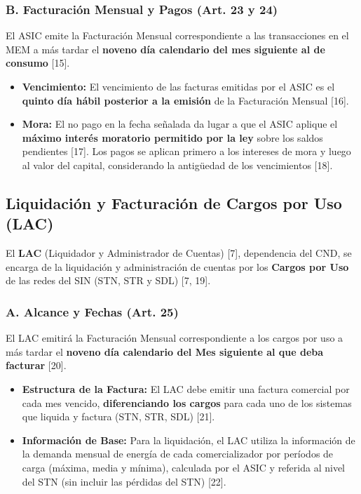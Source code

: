 \documentclass[a5paper]{book}%
\begin{document}
\subsubsection*{B. Facturación Mensual y Pagos (Art. 23 y 24)}
El ASIC emite la Facturación Mensual correspondiente a las transacciones en el MEM a más tardar el \textbf{noveno día calendario del mes siguiente al de consumo} [15].
\begin{itemize}
	\item \textbf{Vencimiento:} El vencimiento de las facturas emitidas por el ASIC es el \textbf{quinto día hábil posterior a la emisión} de la Facturación Mensual [16].
	\item \textbf{Mora:} El no pago en la fecha señalada da lugar a que el ASIC aplique el \textbf{máximo interés moratorio permitido por la ley} sobre los saldos pendientes [17]. Los pagos se aplican primero a los intereses de mora y luego al valor del capital, considerando la antigüedad de los vencimientos [18].
\end{itemize}

\subsection{Liquidación y Facturación de Cargos por Uso (LAC)}

El \textbf{LAC} (Liquidador y Administrador de Cuentas) [7], dependencia del CND, se encarga de la liquidación y administración de cuentas por los \textbf{Cargos por Uso} de las redes del SIN (STN, STR y SDL) [7, 19].

\subsubsection*{A. Alcance y Fechas (Art. 25)}
El LAC emitirá la Facturación Mensual correspondiente a los cargos por uso a más tardar el \textbf{noveno día calendario del Mes siguiente al que deba facturar} [20].
\begin{itemize}
	\item \textbf{Estructura de la Factura:} El LAC debe emitir una factura comercial por cada mes vencido, \textbf{diferenciando los cargos} para cada uno de los sistemas que liquida y factura (STN, STR, SDL) [21].
	\item \textbf{Información de Base:} Para la liquidación, el LAC utiliza la información de la demanda mensual de energía de cada comercializador por períodos de carga (máxima, media y mínima), calculada por el ASIC y referida al nivel del STN (sin incluir las pérdidas del STN) [22].
\end{itemize}
\end{document}
